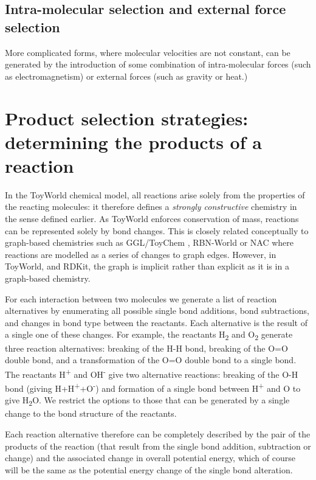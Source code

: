\subsection{Intra-molecular selection and external force selection}\label{intra-molecular-selection-and-external-force-selection}

More complicated forms, where molecular velocities are not constant, can
be generated by the introduction of some combination of intra-molecular
forces (such as electromagnetism) or external forces (such as gravity or
heat.)

\section{Product selection strategies: determining the products of a
reaction}\label{product-selection-strategies}

In the ToyWorld chemical model, all reactions arise solely from the
properties of the reacting molecules: it therefore defines a
\emph{strongly constructive} chemistry in the sense defined earlier. As
ToyWorld enforces conservation of mass, reactions can be represented
solely by bond changes. This is closely related conceptually to
graph-based chemistries such as GGL/ToyChem
\autocite{Benko2005,Benko2003}, RBN-World \autocite{Faulconbridge2011}
or NAC \autocite{Suzuki2006} where reactions are modelled as a series of
changes to graph edges. However, in ToyWorld, and RDKit, the graph is
implicit rather than explicit as it is in a graph-based chemistry.

For each interaction between two molecules we generate a list of reaction alternatives by enumerating all possible single bond additions, bond subtractions, and changes in bond type between the reactants. Each alternative is the result of a single one of these changes. For example, the reactants H\textsubscript{2} and O\textsubscript{2} generate three reaction alternatives: breaking of the H-H bond, breaking of the O=O double bond, and a transformation of the O=O double bond to a single bond. The reactants H\textsuperscript{+} and OH\textsuperscript{-} give two alternative reactions: breaking of the O-H bond (giving H+H\textsuperscript{+}+O\textsuperscript{-}) and formation of a single bond between H\textsuperscript{+} and O to give H\textsubscript{2}O. We restrict the options to those that can be generated by a single change to the bond structure of the reactants.

Each reaction alternative therefore can be completely described by the
pair of the products of the reaction (that result from the single bond
addition, subtraction or change) and the associated change in overall
potential energy, which of course will be the same as the potential
energy change of the single bond alteration.

